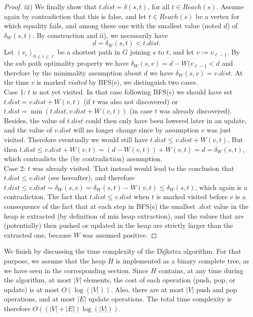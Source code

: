 \documentclass[12pt]{article}
\theoremstyle{plain}
\theoremstyle{remark}
\begin{document}
\begin{proof}
iii) We finally show that $t.dist = \delta(s,t)$, for all $t \in Reach(s).$
Assume again by contradiction that this is false, and let $t \in Reach(s)$ be
a vertex for which equality fails, and among these one with the smallest
value (noted $d$) of $\delta_W(s,t).$ By construction and ii), we necessarily  have
$$
d = \delta_W(s,t) < t.dist.
$$
Let $(v_i)_{0 \leq i \leq \ell}$ be a shortest path in $G$ joining $s$
to $t$, and let $v := v_{\ell - 1}.$ By the sub path optimality property 
we have $\delta_W(s,v) = d - W(v_{\ell-1} < d$ and therefore by the minimality
assumption about $d$ we have $\delta_W(s,v) = v.dist.$  At the time $v$ is
marked {\it visited} by BFS(s), we distinguish two cases.\\
Case 1: $t$ is not yet
visited. In that case following BFS(s) we should have set $t.dist =
v.dist + W(v,t)$ (if $t$ was also not discovered) or $t.dist =
\min(t.dist, v.dist + W(v,t))$ (in case $t$ was already discovered). Besides,
the value of $t.dist$ could then only have been lowered later in an
update, and the value of $v.dist$ will no longer change since by assumption $v$
was just visited. Therefore eventually we would still have   
$t.dist \leq v.dist + W(v,t)$. But then 
$t.dist \leq v.dist + W(v,t) = (d- W(v,t)) + W(v,t) = d = \delta_W(s,t)$, 
which contradicts the (by contradiction) assumption.\\
Case 2: $t$ was already visited. That instead would lead to the conclusion
that $t.dist \leq v.dist$ (see hereafter), and therefore $t.dist \leq v.dist =
\delta_W(s,v) = \delta_W(s,t) - W(v,t) \leq \delta_W(s,t)$, which again is a 
contradiction. The fact that $t.dist \leq v.dist$ when $t$ is marked visited 
before $v$ is a consequence of the fact that at each step in BFS(s) the smallest 
$.dist$ value in the heap is extracted (by definition of min heap
extraction), and the values that are (potentially) 
then pushed or updated in the heap are strictly larger than the extracted one, 
because $W$ was assumed positive. 
\end{proof}

We finish by discussing the time complexity of the Dijkstra algorithm. For that
purpose, we assume that the heap $H$ is implemented as a binary complete tree,
as we have seen in the corresponding section. Since $H$ contains, at any time 
during the algorithm, at most $|V|$ elements, the cost of each operation (push,
pop, or update) is at most $O(\log(|V|))$. Also, there are at most  $|V|$ push
and pop operations, and at most $|E|$ update operations. The total time
complexity is therefore $O((|V|+|E|)\log(|V|)).$
\end{document}
